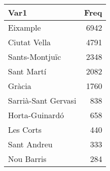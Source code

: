 
\begin{tabular}[t]{lr}
\toprule
Var1 & Freq\\
\midrule
Eixample & 6942\\
Ciutat Vella & 4791\\
Sants-Montjuïc & 2348\\
Sant Martí & 2082\\
Gràcia & 1760\\
\addlinespace
Sarrià-Sant Gervasi & 838\\
Horta-Guinardó & 658\\
Les Corts & 440\\
Sant Andreu & 333\\
Nou Barris & 284\\
\bottomrule
\end{tabular}